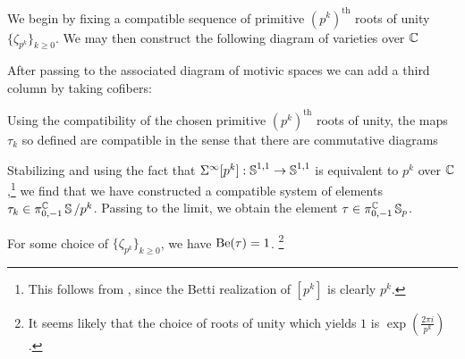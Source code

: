 We begin by fixing a compatible sequence of primitive $(p^k)^{\mathrm{th}}$ roots of unity
$\{\zeta_{p^k}\}_{k \geq 0}$. %
We may then construct the following diagram of varieties over $\mathbb{C}$
\begin{center}
\end{center}
After passing to the associated diagram of motivic spaces we can add a third column by taking cofibers:
\begin{center}
\end{center}
Using the compatibility of the chosen primitive $(p^k)^{\mathrm{th}}$ roots of unity,
the maps $\tau_k$ so defined are compatible in the sense that there are commutative diagrams
\begin{center}
\end{center}


Stabilizing and using the fact that $\Sigma^\infty [p^k] : \operatorname{\mathbb{S}}^{1,1} \to \operatorname{\mathbb{S}}^{1,1}$ is equivalent to $p^k$ over $\mathbb{C}$,\footnote{This follows from , since the Betti realization of $[p^k]$ is clearly $p^k$.} we find that we have constructed a compatible system of elements $\tau_k \in \pi_{0,-1} ^{\mathbb{C}} \operatorname{\mathbb{S}}/p^k$. Passing to the limit, we obtain the element $\tau \in \pi_{0,-1} ^{\mathbb{C}} \operatorname{\mathbb{S}}_p$.

\begin{prop} \label{prop:tau-1}
  For some choice of $\{\zeta_{p^k}\}_{k \geq 0}$, we have $\mathrm{Be}(\tau) = 1$. \footnote{It seems likely that the choice of roots of unity which yields $1$ is $ \exp\left( \frac{2\pi i}{p^k} \right)$.}
\end{prop}

